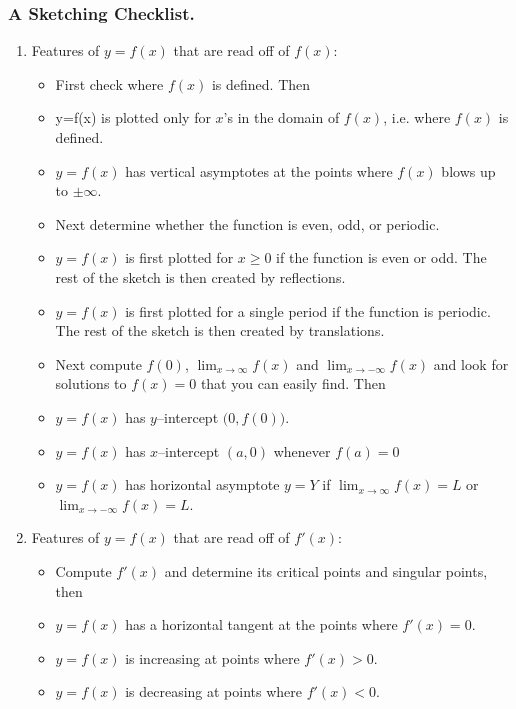 \subsubsection{A Sketching Checklist.}
\begin{enumerate}[(1)]
\item Features of $y = f(x)$ that are read off of $f(x)$:
\begin{itemize}
 \item First check where $f(x)$ is defined. Then
\item y=f(x) is plotted only for $x$'s in the domain of $f(x)$, i.e. where
$f(x)$ is defined.
\item $y = f(x)$ has vertical asymptotes at the points where $f(x)$ blows up to
$\pm\infty$.
\item Next determine whether the function is even, odd, or periodic.
\item $y=f(x)$ is first plotted for $x\ge 0$ if the function is even or odd. The
rest of the sketch is then created by reflections.
\item $y=f(x)$ is first plotted for a single period if the function is periodic.
The rest of the sketch is then created by translations.
\item Next compute $f(0)$, $\lim_{x\rightarrow\infty} f(x)$ and
$\lim_{x\rightarrow-\infty} f(x)$ and look for solutions to $f(x)=0$ that you
can easily find. Then
\item $y = f(x)$ has $y$--intercept $\big(0, f(0)\big)$.
\item $y = f(x)$ has $x$--intercept $(a,0)$ whenever $f(a)=0$
\item $y = f(x)$ has horizontal asymptote $y=Y$ if $\lim_{x\rightarrow\infty}
f(x)=L$ or $\lim_{x\rightarrow-\infty} f(x)=L$.
\end{itemize}

\item Features of $y=f(x)$ that are read off of $f'(x)$:
\begin{itemize}
\item Compute $f'(x)$ and determine its critical points and singular points, then

\item $y=f(x)$ has a horizontal tangent at the points where $f'(x)=0$.

\item $y=f(x)$ is increasing at points where $f'(x)>0$.

\item $y=f(x)$ is decreasing at points where $f'(x)<0$.


\end{itemize}
\end{enumerate}
